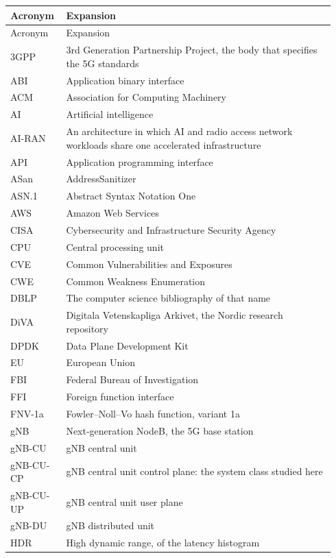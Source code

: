 \documentclass[english,oneside,a4paper,censored,csm,software-track-2020]{HYthesisML}
\renewcommand{\arraystretch}{0.95}
\begin{document}
\begingroup
\singlespacing
\footnotesize
\renewcommand{\arraystretch}{1.15}
\begin{longtable}{@{}p{0.15\linewidth} p{0.79\linewidth}@{}}
\hline\hline
Acronym & Expansion \\
\hline
\endfirsthead
\hline\hline
Acronym & Expansion \\
\hline
\endhead
3GPP & 3rd Generation Partnership Project, the body that specifies the 5G standards \\
ABI & Application binary interface \\
ACM & Association for Computing Machinery \\
AI & Artificial intelligence \\
AI-RAN & An architecture in which AI and radio access network workloads share one accelerated infrastructure \\
API & Application programming interface \\
ASan & AddressSanitizer \\
ASN.1 & Abstract Syntax Notation One \\
AWS & Amazon Web Services \\
CISA & Cybersecurity and Infrastructure Security Agency \\
CPU & Central processing unit \\
CVE & Common Vulnerabilities and Exposures \\
CWE & Common Weakness Enumeration \\
DBLP & The computer science bibliography of that name \\
DiVA & Digitala Vetenskapliga Arkivet, the Nordic research repository \\
DPDK & Data Plane Development Kit \\
EU & European Union \\
FBI & Federal Bureau of Investigation \\
FFI & Foreign function interface \\
FNV-1a & Fowler--Noll--Vo hash function, variant 1a \\
gNB & Next-generation NodeB, the 5G base station \\
gNB-CU & gNB central unit \\
gNB-CU-CP & gNB central unit control plane: the system class studied here \\
gNB-CU-UP & gNB central unit user plane \\
gNB-DU & gNB distributed unit \\
HDR & High dynamic range, of the latency histogram \\

\end{longtable}
\end{document}
